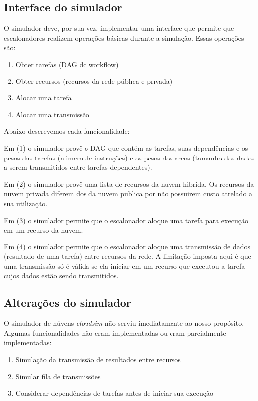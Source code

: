 \documentclass[a4paper,10pt, draft]{article}
\begin{document}
\subsection{Interface do simulador}

O simulador deve, por sua vez, implementar uma interface que permite que escalonadores
realizem operações básicas durante a simulação. Essas operações são:

\begin{enumerate}

  \item Obter tarefas (DAG do workflow)
  \item Obter recursos (recursos da rede pública e privada)
  \item Alocar uma tarefa
  \item Alocar uma transmissão

\end{enumerate}

Abaixo descrevemos cada funcionalidade:

Em (1) o simulador provê o DAG que contém as tarefas, suas dependências e os pesos das tarefas (número
de instruções) e os pesos dos arcos (tamanho dos dados a serem transmitidos entre tarefas dependentes).

Em (2) o simulador provê uma lista de recursos da nuvem hibrida. Os recursos da nuvem privada diferem
dos da nuvem publica por não possuirem custo atrelado a sua utilização.

Em (3) o simulador permite que o escalonador aloque uma tarefa para execução em um recurso da nuvem.

Em (4) o simulador permite que o escalonador aloque uma transmissão de dados (resultado de uma tarefa)
entre recursos da rede. A limitação imposta aqui é que uma transmissão só é válida se ela iniciar em um
recurso que executou a tarefa cujos dados estão sendo transmitidos.

\subsection{Alterações do simulador}

O simulador de núvens \emph{cloudsim} não serviu imediatamente ao nosso propósito. Algumas funcionalidades
não eram implementadas ou eram parcialmente implementadas:

\begin{enumerate}

  \item Simulação da transmissão de resultados entre recursos
  \item Simular fila de transmissões
  \item Considerar dependências de tarefas antes de iniciar sua execução

\end{enumerate}
\end{document}
